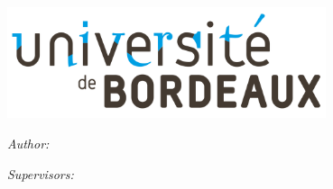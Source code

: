 

\begin{titlepage}

\setlength{\parskip}{0pt}

\begin{center}
\includegraphics[width=0.7\textwidth]{Figures/brdx}

\ifxetex
    \vspace{0.6cm}
    {\zhawtitlefont\color{zhawblue}\LARGE \univname\par}   %
    \vspace{0.2cm}
\else
    \vspace{0.87cm}
    \vspace{0.05cm}
\fi
{\Large \deptname\par}                      %
\vspace{0.2cm}
{\Large \instname\par}                                 %
\vspace{3.5cm}
\textsc{\Large \ttype}                                 %
\vspace{0.2cm}
\HRule
\vspace{0.4cm}
{\huge \bfseries \ttitle\par}                          %
\vspace{0.4cm}
\HRule
\vspace{1.5cm}


\begin{minipage}[t]{0.4\textwidth}
\begin{flushleft}
    \large
    \emph{Author:}\\
    \authorname
\end{flushleft}
\end{minipage}
\begin{minipage}[t]{0.4\textwidth}
\begin{flushright}
    \large
    \emph{Supervisors:} \\
    \supnameA \\
    \supnameB
\end{flushright}
\end{minipage}
\vspace{2cm}


\end{center}
\end{titlepage}
